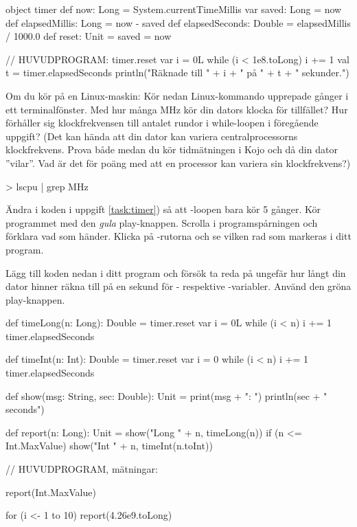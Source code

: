 \begin{Code}
object timer {
  def now: Long = System.currentTimeMillis
  var saved: Long = now
  def elapsedMillis: Long = now - saved
  def elapsedSeconds: Double = elapsedMillis / 1000.0
  def reset: Unit = { saved = now }
}

// HUVUDPROGRAM:
timer.reset
var i = 0L
while (i < 1e8.toLong) { i += 1 }
val t = timer.elapsedSeconds
println("Räknade till " + i + " på " + t + " sekunder.")
\end{Code}

\Subtask  Om du kör på en Linux-maskin: Kör nedan Linux-kommando upprepade gånger i ett terminalfönster. Med hur många MHz kör din dators klocka för tillfället? Hur förhåller sig klockfrekvensen till antalet rundor i while-loopen i föregående uppgift? (Det kan hända att din dator kan variera centralprocessorns klockfrekvens. Prova både medan du kör tidmätningen i Kojo och då din dator ''vilar''. Vad är det för poäng med att en processor kan variera sin klockfrekvens?)
\begin{REPL}
> lscpu | grep MHz
\end{REPL}


\Subtask Ändra i koden i uppgift \ref{task:timer}) så att -loopen bara kör 5 gånger. Kör programmet med den \emph{gula} play-knappen. Scrolla i programspårningen och förklara vad som händer. Klicka på -rutorna och se vilken rad som markeras i ditt program.

\Subtask Lägg till koden nedan i ditt program och försök ta reda på ungefär hur långt din dator hinner räkna till på en sekund för - respektive -variabler. Använd den gröna play-knappen.
\begin{Code}
def timeLong(n: Long): Double = {
  timer.reset
  var i = 0L
  while (i < n) { i += 1 }
  timer.elapsedSeconds
}

def timeInt(n: Int): Double = {
  timer.reset
  var i = 0
  while (i < n) { i += 1 }
  timer.elapsedSeconds
}

def show(msg: String, sec: Double): Unit = {
  print(msg + ": ")
  println(sec + " seconds")
}

def report(n: Long): Unit = {
  show("Long " + n, timeLong(n))
  if (n <= Int.MaxValue) show("Int  " + n, timeInt(n.toInt))
}

// HUVUDPROGRAM, mätningar:

report(Int.MaxValue)

for (i <- 1 to 10) {
  report(4.26e9.toLong)
}
\end{Code}

